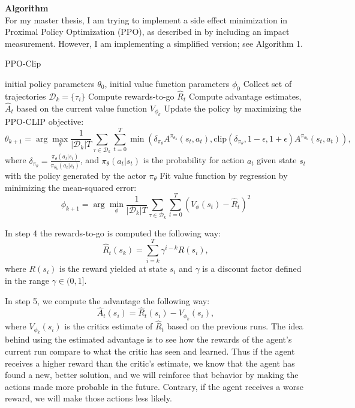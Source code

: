 \documentclass[12pt,A4]{report}
\begin{document}
\textbf{Algorithm}\\
For my master thesis, I am trying to implement a side effect minimization in Proximal Policy Optimization (PPO), as described in \citet{schulman2017proximal} by including an impact measurement. However, I am implementing a simplified version; see Algorithm 1. 

\begin{algorithm}
\caption{PPO-Clip}\label{alg:cap}
\begin{algorithmic}[1]
\State initial policy parameters $\theta_{0}$, initial value function parameters $\phi_{0}$
  \State Collect set of trajectories $\mathcal{D}_k = \{\tau_i\}$
  \State Compute rewards-to-go $\hat{R}_t$
  \State Compute advantage estimates, $\hat{A}_t$ based on the current value function $V_{\phi_k}$
  \State Update the policy by maximizing the PPO-CLIP objective:
  \[ \theta_{k+1} = \arg \max_\theta \frac{1}{|\mathcal{D}_k|T} \sum_{\tau\in\mathcal{D}_k} \sum_{t=0}^T \min \left ( \delta_{\pi_\theta} A^{\pi_{\theta_k}} (s_t, a_t), \text{clip}(\delta_{\pi_\theta}, 1-\epsilon, 1+\epsilon )A^{\pi_{\theta_k}}(s_t, a_t)\right),\]
  where $\delta_{\pi_\theta} = \frac{\pi_\theta(a_t|s_t)}{\pi_{\theta_k}(a_t|s_t)}$, and $\pi_{\theta}(a_t|s_t)$ is the probability for action $a_t$ given state $s_t$ with the policy generated by the actor $\pi_\theta$
  \State Fit value function by regression by minimizing the mean-squared error:
  \[ \phi_{k+1} = \arg \min_\phi \frac{1}{|\mathcal{D}_k|T}\sum_{\tau\in\mathcal{D}_k} \sum_{t=0}^T \left( V_\phi(s_t) - \hat{R}_t \right) ^ 2\]
\EndFor
\end{algorithmic}
\end{algorithm}

In step 4 the rewards-to-go is computed the following way:
\[ \hat{R}_t (s_k) = \sum_{i=k}^T \gamma^{i-k}R(s_i),\]
where $R(s_i)$ is the reward yielded at state $s_i$ and $\gamma$ is a discount factor defined in the range $\gamma \in (0,1]$.

In step 5, we compute the advantage the following way:
\[ \hat{A}_t(s_i) = \hat{R}_t(s_i) - V_{\phi_k}(s_i), \]
where $V_{\phi_k}(s_i)$ is the critics estimate of $\hat{R}_t$ based on the previous runs. The idea behind using the estimated advantage is to see how the rewards of the agent's current run compare to what the critic has seen and learned. Thus if the agent receives a higher reward than the critic's estimate, we know that the agent has found a new, better solution, and we will reinforce that behavior by making the actions made more probable in the future. Contrary, if the agent receives a worse reward, we will make those actions less likely. 
\end{document}
